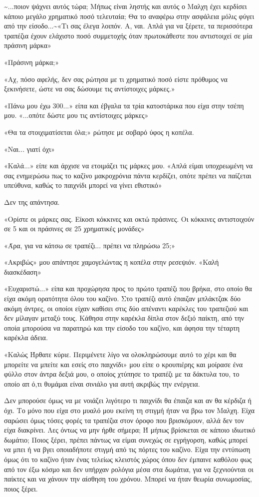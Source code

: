 \documentclass[12pt,twoside, openany]{book}
\begin{document}
\textasciitilde ...ποιον ψάχνει αυτός τώρα; Μήπως είναι ληστής και αυτός ο Μαλχη έχει κερδίσει κάποιο μεγάλο χρηματικό ποσό τελευταία; Θα το αναφέρω στην ασφάλεια μόλις φύγει από την είσοδο...\textasciitilde «Τι σας έλεγα λοιπόν. Α, ναι. Απλά για να ξέρετε, τα περισσότερα τραπέζια έχουν ελάχιστο ποσό συμμετοχής όταν πρωτοκάθεστε που αντιστοιχεί σε μία πράσινη μάρκα»

«Πράσινη μάρκα;»

«Αχ, πόσο αφελής, δεν σας ρώτησα με τι χρηματικό ποσό είστε πρόθυμος να ξεκινήσετε, ώστε να σας δώσουμε τις αντίστοιχες μάρκες.»

«Πάνω μου έχω 300...» είπα και έβγαλα τα τρία κατοστάρικα που είχα στην τσέπη μου. «...οπότε δώστε μου τις αντίστοιχες μάρκες»

«Θα τα στοιχιματίσεται όλα;» ρώτησε με σοβαρό ύφος η κοπέλα.

«Ναι... γιατί όχι»

«Καλά...» είπε και άρχισε να ετοιμάζει τις μάρκες μου. «Απλά είμαι υποχρεωμένη να σας ενημερώσω πως το καζίνο μακροχρόνια πάντα κερδίζει, οπότε πρέπει να παίζεται υπεύθυνα, καθώς το παιχνίδι μπορεί να γίνει εθιστικό»

Δεν της απάντησα.

«Ορίστε οι μάρκες σας. Είκοσι κόκκινες και οκτώ πράσινες. Οι κόκκινες αντιστοιχούν σε 5 και οι πράσινες σε 25 χρηματικές μονάδες»

«Άρα, για να κάτσω σε τραπέζι... πρέπει να πληρώσω 25;»

«Ακριβώς» μου απάντησε χαμογελώντας η κοπέλα στην ρεσεψιόν. «Καλή διασκέδαση»

«Ευχαριστώ...» είπα και προχώρησα προς το πρώτο τραπέζι που βρήκα, στο οποίο θα είχα ακόμη ορατότητα όλου του καζίνο. Στο τραπέζι αυτό έπαιζαν μπλάκτζακ δύο ακόμη άντρες, οι οποίοι είχαν καθίσει στις δύο απέναντι καρέκλες του τραπεζιού και δεν μίλαγαν μεταξύ τους. Κάθησα στην καρέκλα δίπλα στον δεξιό παίκτη, από την οποία μπορούσα να παρατηρώ και την είσοδο του καζίνο, και άφησα την τέταρτη καρέκλα άδεια.

«Καλώς Ήρθατε κύριε. Περιμένετε λίγο να ολοκληρώσουμε αυτό το χέρι και θα μπορείτε να μπείτε και εσείς στο παιχνίδι» μου είπε ο κρουπιέρης και μοίρασε ένα φύλλο στον άντρα δεξιά μου, ο οποίος χτύπησε το τραπέζι με τα δάκτυλα του, το οποίο απ ό,τι θυμάμαι είναι σινιάλο για αυτή ακριβώς την ενέργεια. 

Δεν μπορούσε όμως να με νοιάζει λιγότερο τι παιχνίδι θα έπαιζα και αν θα κέρδιζα ή όχι. Το μόνο που είχα στο μυαλό μου εκείνη τη στιγμή ήταν να βρω τον Μαλχη. Είχα σαρώσει όμως τόσες φορές τα τραπέζια στον όροφο που βρισκόμουν, αλλά δεν τον είχα διακρίνει. Λες όντως να μην ήρθε σήμερα; Ή μήπως βρίσκεται σε κάποιο ιδιωτικό δωμάτιο; Ποιος ξέρει, πρέπει πάντως να είμαι συνεχώς σε εγρήγορση, καθώς μπορεί να μπει ή να βγει οποιαδήποτε στιγμή από τις πόρτες του καζίνο. Είχα την εντύπωση όμως ότι το καζίνο ήταν ένας τελείως κλειστός χώρος όπου δεν έμπαινε καθόλου φως από τον έξω κόσμο και δεν υπήρχαν ρολόγια μέσα στα δωμάτια, για να ξεχνιούνται οι παίκτες και να χάνουν την αίσθηση του χρόνου. Μπορεί να ήταν θεωρία συνωμοσίας, ποιος ξέρει.
\end{document}
